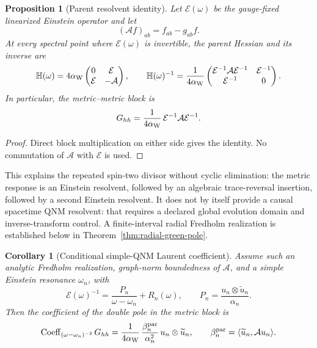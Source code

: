 \documentclass[11pt]{article}
\newtheorem{proposition}[theorem]{Proposition}
\newtheorem{corollary}[theorem]{Corollary}
\theoremstyle{definition}
\theoremstyle{remark}
\begin{document}
\begin{proposition}[Parent resolvent identity]
\label{prop:parent-resolvent}
Let \(\mathcal E(\omega)\) be the gauge-fixed linearized Einstein operator
and let
\[
(\mathcal Af)_{ab}=f_{ab}-g_{ab}f.
\]
At every spectral point where \(\mathcal E(\omega)\) is invertible, the
parent Hessian and its inverse are
\[
\mathbb H(\omega)
=4\alpha_{\rm W}
\begin{pmatrix}
0&\mathcal E\\
\mathcal E&-\mathcal A
\end{pmatrix},
\qquad
\mathbb H(\omega)^{-1}
=\frac1{4\alpha_{\rm W}}
\begin{pmatrix}
\mathcal E^{-1}\mathcal A\mathcal E^{-1}&\mathcal E^{-1}\\
\mathcal E^{-1}&0
\end{pmatrix}.
\]
In particular, the metric--metric block is
\[
G_{hh}
=\frac1{4\alpha_{\rm W}}\,
\mathcal E^{-1}\mathcal A\mathcal E^{-1}.
\]
\end{proposition}

\begin{proof}
Direct block multiplication on either side gives the identity.  No
commutation of \(\mathcal A\) with \(\mathcal E\) is used.
\end{proof}

This explains the repeated spin-two divisor without cyclic elimination:
the metric response is an Einstein resolvent, followed by an algebraic
trace-reversal insertion, followed by a second Einstein resolvent.  It does
not by itself provide a causal spacetime QNM resolvent: that requires a
declared global evolution domain and inverse-transform control.  A
finite-interval radial Fredholm realization is established below in
Theorem~\ref{thm:radial-green-pole}.

\begin{corollary}[Conditional simple-QNM Laurent coefficient]
\label{cor:conditional-parent-pole}
Assume such an analytic Fredholm realization, graph-norm boundedness of
\(\mathcal A\), and a simple Einstein resonance \(\omega_n\), with
\[
\mathcal E(\omega)^{-1}
=\frac{P_n}{\omega-\omega_n}+R_n(\omega),
\qquad
P_n=\frac{u_n\otimes\widetilde u_n}{\alpha_n}.
\]
Then the coefficient of the double pole in the metric block is
\[
\operatorname{Coeff}_{(\omega-\omega_n)^{-2}}G_{hh}
=
\frac1{4\alpha_{\rm W}}\,
\frac{\beta_n^{\rm par}}{\alpha_n^2}\,
u_n\otimes\widetilde u_n,
\qquad
\beta_n^{\rm par}
=\langle\widetilde u_n,\mathcal Au_n\rangle .
\]
\end{corollary}
\end{document}
